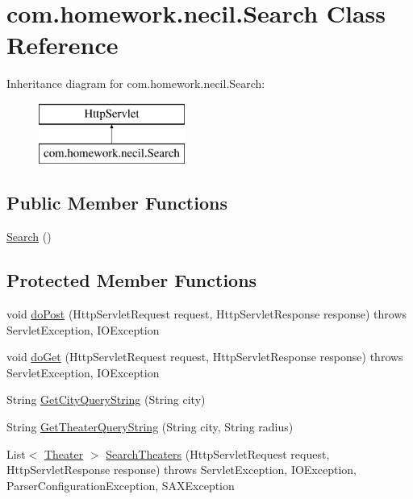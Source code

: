 \hypertarget{classcom_1_1homework_1_1necil_1_1_search}{}\section{com.\+homework.\+necil.\+Search Class Reference}
\label{classcom_1_1homework_1_1necil_1_1_search}
Inheritance diagram for com.\+homework.\+necil.\+Search\+:\begin{figure}[H]
\begin{center}
\leavevmode
\includegraphics[height=2.000000cm]{classcom_1_1homework_1_1necil_1_1_search}
\end{center}
\end{figure}
\subsection*{Public Member Functions}
\begin{DoxyCompactItemize}
\item 
\hyperlink{classcom_1_1homework_1_1necil_1_1_search_a9f611369080385eed21dd6518f9f2d79}{Search} ()
\end{DoxyCompactItemize}
\subsection*{Protected Member Functions}
\begin{DoxyCompactItemize}
\item 
void \hyperlink{classcom_1_1homework_1_1necil_1_1_search_a22276ce0fef9404e4dc65a57101745b8}{do\+Post} (Http\+Servlet\+Request request, Http\+Servlet\+Response response)  throws Servlet\+Exception, I\+O\+Exception 
\item 
void \hyperlink{classcom_1_1homework_1_1necil_1_1_search_ad79fcea5cdd49c83ecbca98f115bc20b}{do\+Get} (Http\+Servlet\+Request request, Http\+Servlet\+Response response)  throws Servlet\+Exception, I\+O\+Exception 
\item 
String \hyperlink{classcom_1_1homework_1_1necil_1_1_search_ad234c92406b26b3c67f282f15898add5}{Get\+City\+Query\+String} (String city)
\item 
String \hyperlink{classcom_1_1homework_1_1necil_1_1_search_a93abaaf18a08e1c44a6cd9f20e8d13fd}{Get\+Theater\+Query\+String} (String city, String radius)
\item 
List$<$ \hyperlink{classcom_1_1homework_1_1necil_1_1_theater}{Theater} $>$ \hyperlink{classcom_1_1homework_1_1necil_1_1_search_ae5133f45d8df829ea73598b981f3b651}{Search\+Theaters} (Http\+Servlet\+Request request, Http\+Servlet\+Response response)  throws Servlet\+Exception, I\+O\+Exception, Parser\+Configuration\+Exception, S\+A\+X\+Exception 
\end{DoxyCompactItemize}


